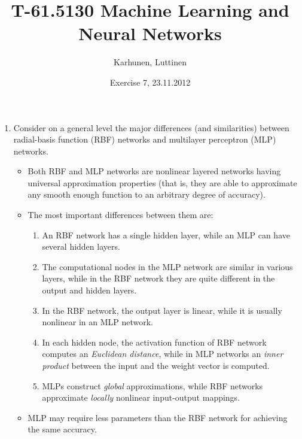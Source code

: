 
\title{T-61.5130 Machine Learning and Neural Networks}
\author{Karhunen, Luttinen}
\date{Exercise 7, 23.11.2012}

\newcommand{\vect}[1]{{\bf{#1}}}
\newcommand{\svect}[1]{\boldsymbol{#1}}
\newcommand{\matr}[1]{\boldsymbol{#1}}




\maketitle

\begin{enumerate}

\item Consider on a general level the major differences (and similarities)
  between radial-basis function (RBF) networks and multilayer perceptron
  (MLP) networks.

  \begin{solution}

    \begin{itemize}
    \item Both RBF and MLP networks are nonlinear layered networks having
      universal approximation properties (that is, they are able to
      approximate any smooth enough function to an arbitrary degree of accuracy).
    \item The most important differences between them are:
      \begin{enumerate}
      \item An RBF network has a single hidden layer, while an MLP can have
        several hidden layers.
      \item The computational nodes in the MLP network are similar in various layers,
        while in the RBF network they are quite different in the output
        and hidden layers.
      \item In the RBF network, the output layer is linear, while it is usually
        nonlinear in an MLP network.
      \item In each hidden node, the activation function of RBF network computes
        an {\em Euclidean distance}, while in MLP networks an {\em inner product}
        between the input and the weight vector is computed.
      \item MLPs construct {\em global} approximations, while RBF networks
        approximate {\em locally} nonlinear input-output mappings.
      \end{enumerate}
    \item MLP may require less parameters than the RBF network for achieving
      the same accuracy.
    \end{itemize}


\end{solution}
\end{enumerate}
